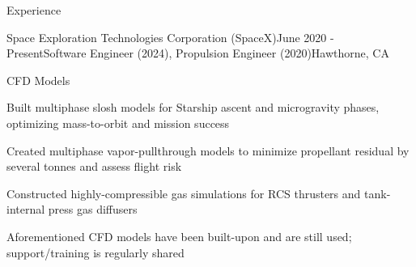 \documentclass{resume} %
\begin{document}
\begin{rSection}{Experience}
\begin{rSubsection}{{Space Exploration Technologies Corporation (SpaceX)}}{June 2020 - Present}{Software Engineer (2024), Propulsion Engineer (2020)}{Hawthorne, CA}
  \begin{rSubsubsection}{CFD Models}
    \item {\small Built multiphase slosh models for Starship ascent and microgravity phases, optimizing mass-to-orbit and mission success}
    \item {\small Created multiphase vapor-pullthrough models to minimize propellant residual by several tonnes and assess flight risk}
    \item {\small Constructed highly-compressible gas simulations for RCS thrusters and tank-internal press gas diffusers  }
    \item {\small Aforementioned CFD models have been built-upon and are still used; support/training is regularly shared}
  \end{rSubsubsection}




\end{rSubsection}
\end{rSection}
\end{document}
